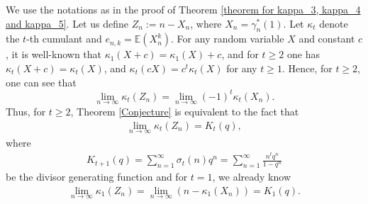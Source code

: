 \documentclass[11pt,reqno]{amsart}
\renewcommand{\(}{\left\(}
\renewcommand{\)}{\right\)}
\renewcommand{\[}{\left\[}
\renewcommand{\]}{\right\]}
\numberwithin{equation}{section}
\theoremstyle{plain}
\begin{document}
We use the notations as in the proof of Theorem \ref{theorem for kappa_3, kappa_4 and kappa_5}.   Let  us define $Z_n:=n-X_n$,  where $X_n = \gamma_n^*(1)$. 
Let $\kappa_t$ denote the $t$-th cumulant and $e_{n,k} = \mathbb{E}(X_n^k)$.  For any random variable $X$ and constant $c$,  it is well-known that $\kappa_1(X+c)= \kappa_1(X)+c$,  and for $t \geq 2$ one has $\kappa_t(X+ c)= \kappa_t(X)$,  and $\kappa_t(c X)= c^t \kappa_t(X)$ for any $t\geq 1$.   Hence,  for $t \geq 2$,  one can see that 
$$
\lim_{n \to \infty} \kappa_t(Z_n)= \lim_{n\to\infty} (-1)^t\kappa_t(X_n).  
$$
Thus,  for $t\geq 2$,  Theorem \ref{Conjecture} is equivalent to the fact that
\begin{align}\label{Conjecture in term of Y_n}
\lim_{n \to \infty} \kappa_t(Z_n) = K_{t}(q),
\end{align}
where 
\begin{align*}
K_{t+1}(q)=\sum_{n=1}^\infty \sigma_{t}(n)q^n = \sum_{n=1}^\infty \frac{n^tq^n}{1-q^n}
\end{align*}
be the divisor generating function and for $t=1$, we already know
\begin{align*}
\lim_{n \to \infty} \kappa_1(Z_n)= \lim_{n\to\infty}(n- \kappa_1(X_n)) = K_{1}(q).
\end{align*}
\end{document}
